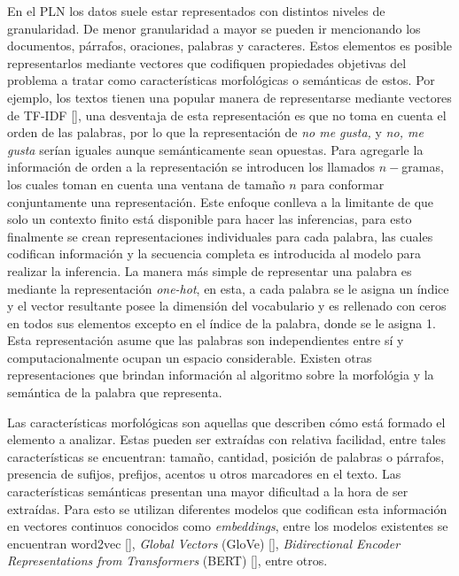 En el PLN los datos suele estar representados con distintos niveles de granularidad.
De menor granularidad a mayor se pueden ir mencionando los documentos, párrafos, oraciones, palabras y
caracteres. Estos elementos es posible representarlos mediante vectores que codifiquen propiedades
objetivas del problema a tratar como características morfológicas o semánticas de estos. Por ejemplo, 
los textos tienen una popular manera de representarse mediante vectores de TF-IDF [\cite{manning2008introduction}],
una desventaja de esta representación es que no toma en cuenta el orden de las palabras, por lo que 
la representación de \emph{no me gusta,} y \emph{no, me gusta} serían iguales aunque semánticamente 
sean opuestas. Para agregarle la información de orden a la representación se introducen los llamados 
$n-$gramas, los cuales toman en cuenta una ventana de tamaño $n$ para conformar conjuntamente una representación.
Este enfoque conlleva a la limitante de que solo un contexto finito está disponible para hacer las inferencias,
para esto finalmente se crean representaciones individuales para cada palabra, las cuales codifican 
información y la secuencia completa es introducida al modelo para realizar la inferencia.
La manera más simple de representar una palabra es mediante la representación \emph{one-hot}, 
en esta, a cada palabra se le asigna un índice y el vector resultante posee la dimensión del 
vocabulario y es rellenado con ceros en todos sus elementos excepto en el índice de la palabra, donde se le asigna 1.
Esta representación asume que las palabras son independientes entre sí y 
computacionalmente ocupan un espacio considerable. Existen otras representaciones 
que brindan información al algoritmo sobre la morfológia y la semántica de la palabra que representa.

Las características morfológicas son aquellas que describen cómo está formado el elemento a analizar.
Estas pueden ser extraídas con relativa facilidad, entre tales características se encuentran: tamaño, 
cantidad, posición de palabras o párrafos, presencia de sufijos, prefijos, acentos u otros marcadores
en el texto. Las características semánticas presentan una mayor dificultad a la hora de ser extraídas.
Para esto se utilizan diferentes modelos que codifican esta información en vectores continuos conocidos como 
\emph{embeddings}, entre los modelos existentes se encuentran
word2vec [\cite{mikolov2013efficient}], 
\emph{Global Vectors} (GloVe) [\cite{pennington2014glove}], 
\emph{Bidirectional Encoder Representations from Transformers} (BERT) [\cite{devlin2018bert}],
entre otros.

